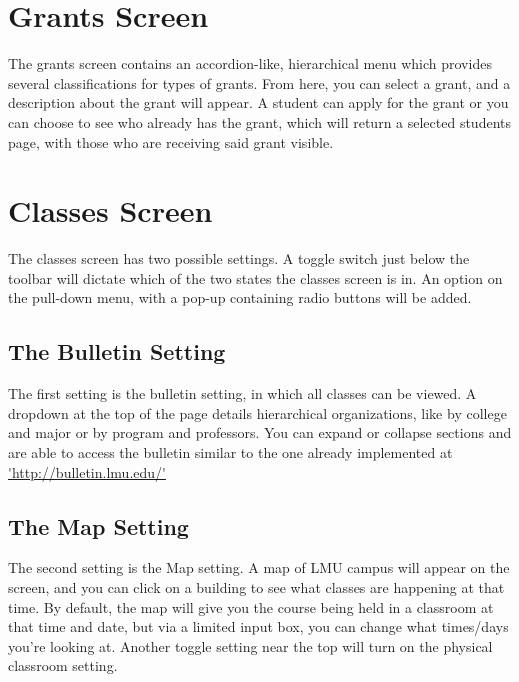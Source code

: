 \documentclass[12pt onesided letterpaper]{article}
\begin{document}
\section*{Grants Screen}
The grants screen contains an accordion-like, hierarchical menu which provides several classifications for types of grants.  From here, you can select a grant, and a description about the grant will appear.  A student can apply for the grant or you can choose to see who already has the grant, which will return a selected students page, with those who are receiving said grant visible. 

\section*{Classes Screen}
The classes screen has two possible settings.  A toggle switch just below the toolbar will dictate which of the two states the classes screen is in.  An option on the pull-down menu, with a pop-up containing  radio buttons will be added.  

\subsection*{The Bulletin Setting}
The first setting is the bulletin setting, in which all classes can be viewed.  A dropdown at the top of the page details hierarchical organizations, like by college and major or by program and professors. You can expand or collapse sections and are able to access the bulletin similar to the one already implemented at \url{'http://bulletin.lmu.edu/'}
\\
\subsection*{The Map Setting}
The second setting is the Map setting.  A map of LMU campus will appear on the screen, and you can click on a building to see what classes are happening at that time.  By default, the map will give you the course being held in a classroom at that time and date, but via a limited input box, you can change what times/days you're looking at.  Another toggle setting near the top will turn on the physical classroom setting.
\\
\end{document}
